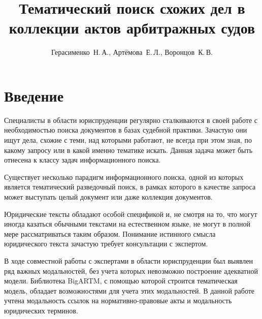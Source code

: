 \documentclass[12pt,twoside]{article}
\title
    [Тематический поиск схожих дел в коллекции актов арбитражных судов] %
    {Тематический поиск схожих дел в коллекции актов арбитражных судов}
\author
    [Герасименко~Н.\,А.] %
    {Герасименко~Н.\,А., Артёмова~Е.\,Л., Воронцов~К.\,В.} %
    [Герасименко~Н.\,А.$^1$, Артёмова~Е.\,Л.$^2$, Воронцов~К.\,В.$^3$] %
\begin{document}
\maketitle
\section{Введение}




Специалисты в области юриспруденции регулярно сталкиваются в своей работе с необходимостью поиска документов в базах судебной практики. Зачастую они ищут дела, схожие с теми, над которыми работают, не всегда при этом зная, по какому запросу или в какой именно тематике искать. Данная задача может быть отнесена к классу задач информационного поиска.

Существует несколько парадигм информационного поиска, одной из которых является тематический разведочный поиск, в рамках которого в качестве запроса может выступать целый документ или даже коллекция документов.


Юридические тексты обладают особой спецификой и, не смотря на то, что могут иногда казаться обычными текстами на естественном языке, не могут в полной мере рассматриваться таким образом. Понимание истинного смысла юридического текста зачастую требует консультации с экспертом.

В ходе совместной работы с экспертами в области юриспруденции был выявлен ряд важных модальностей, без учета которых невозможно построение адекватной модели. Библиотека BigARTM\cite{BigARTM2015}, с помощью которой строится тематическая модель, обладает возможностями для учета этих модальностей. В данной работе учтена модальность ссылок на нормативно-правовые акты и модальность юридических терминов.

\end{document}
